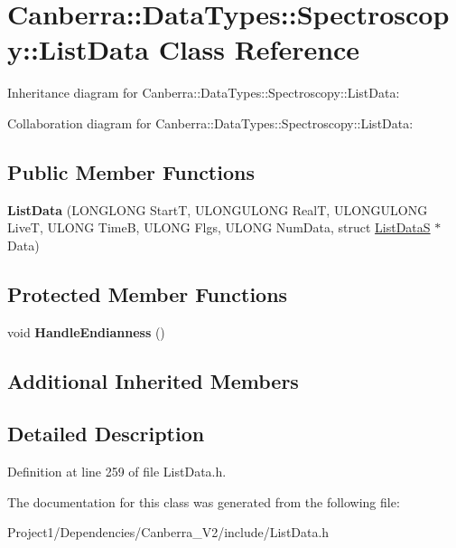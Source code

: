 \hypertarget{class_canberra_1_1_data_types_1_1_spectroscopy_1_1_list_data}{}\section{Canberra\+:\+:Data\+Types\+:\+:Spectroscopy\+:\+:List\+Data Class Reference}
\label{class_canberra_1_1_data_types_1_1_spectroscopy_1_1_list_data}


Inheritance diagram for Canberra\+:\+:Data\+Types\+:\+:Spectroscopy\+:\+:List\+Data\+:


Collaboration diagram for Canberra\+:\+:Data\+Types\+:\+:Spectroscopy\+:\+:List\+Data\+:
\subsection*{Public Member Functions}
\begin{DoxyCompactItemize}
\item 
\mbox{\label{class_canberra_1_1_data_types_1_1_spectroscopy_1_1_list_data_ab92092fa5e9909c1624dfb1f77a2fe9c}} 
{\bfseries List\+Data} (L\+O\+N\+G\+L\+O\+NG StartT, U\+L\+O\+N\+G\+U\+L\+O\+NG RealT, U\+L\+O\+N\+G\+U\+L\+O\+NG LiveT, U\+L\+O\+NG TimeB, U\+L\+O\+NG Flgs, U\+L\+O\+NG Num\+Data, struct \hyperlink{struct_canberra_1_1_data_types_1_1_spectroscopy_1_1_list_data_s}{List\+DataS} $\ast$Data)
\end{DoxyCompactItemize}
\subsection*{Protected Member Functions}
\begin{DoxyCompactItemize}
\item 
\mbox{\label{class_canberra_1_1_data_types_1_1_spectroscopy_1_1_list_data_a3d6427816eeb489e3046f0bd0730decd}} 
void {\bfseries Handle\+Endianness} ()
\end{DoxyCompactItemize}
\subsection*{Additional Inherited Members}


\subsection{Detailed Description}


Definition at line 259 of file List\+Data.\+h.



The documentation for this class was generated from the following file\+:\begin{DoxyCompactItemize}
\item 
Project1/\+Dependencies/\+Canberra\+\_\+\+V2/include/List\+Data.\+h\end{DoxyCompactItemize}

